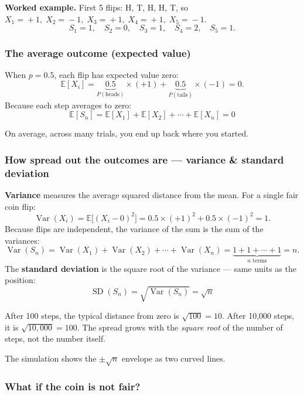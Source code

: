 \documentclass[12pt, a4paper]{article}
\newcommand{\E}{\mathbb{E}}            %
\newcommand{\Var}{\operatorname{Var}}
\newcommand{\SD}{\operatorname{SD}}
\begin{document}
\textbf{Worked example.}  First 5 flips: H, T, H, H, T, so
$X_1\!=\!+1,\; X_2\!=\!-1,\; X_3\!=\!+1,\; X_4\!=\!+1,\; X_5\!=\!-1$.
\[
  S_1=1,\quad S_2=0,\quad S_3=1,\quad S_4=2,\quad S_5=1.
\]

\subsubsection*{The average outcome (expected value)}

When $p = 0.5$, each flip has expected value zero:
\[
  \E[X_i]
    = \underbrace{0.5}_{P(\text{heads})} \times (+1)
    + \underbrace{0.5}_{P(\text{tails})} \times (-1)
    = 0.
\]
Because each step averages to zero:
\[
  \boxed{\E[S_n] = \E[X_1] + \E[X_2] + \cdots + \E[X_n] = 0}
\]

\begin{plainlanguage}
On average, across many trials, you end up back where you started.
\end{plainlanguage}

\subsubsection*{How spread out the outcomes are --- variance \& standard deviation}

\textbf{Variance} measures the average squared distance from the mean.
For a single fair coin flip:
\[
  \Var(X_i) = \E\bigl[(X_i - 0)^2\bigr]
  = 0.5 \times (+1)^2 + 0.5 \times (-1)^2
  = 1.
\]
Because flips are independent, the variance of the sum is the sum of
the variances:
\[
  \Var(S_n) = \Var(X_1) + \Var(X_2) + \cdots + \Var(X_n)
  = \underbrace{1 + 1 + \cdots + 1}_{n\text{ terms}} = n.
\]
The \textbf{standard deviation} is the square root of the variance ---
same units as the position:
\[
  \boxed{\SD(S_n) = \sqrt{\Var(S_n)} = \sqrt{n}}
\]

\begin{plainlanguage}
After 100 steps, the typical distance from zero is $\sqrt{100}=10$.
After 10,000 steps, it is $\sqrt{10{,}000}=100$.  The spread grows with the
\emph{square root} of the number of steps, not the number itself.
\end{plainlanguage}

The simulation shows the $\pm\sqrt{n}$ envelope as two curved lines.

\subsubsection*{What if the coin is not fair?}
\end{document}
